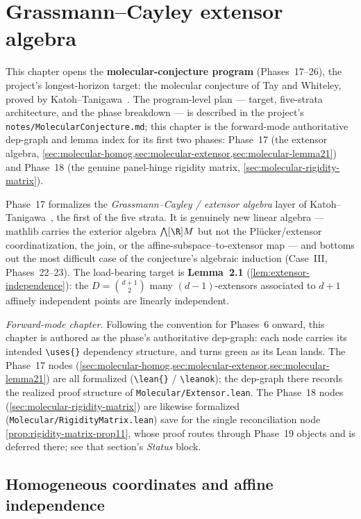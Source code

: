 \section{Grassmann--Cayley extensor algebra}
\label{sec:molecular}

This chapter opens the \textbf{molecular-conjecture program}
(Phases~17--26), the project's longest-horizon target: the molecular
conjecture of Tay and Whiteley, proved by
Katoh--Tanigawa~\cite{katohTanigawa2011}. The program-level plan ---
target, five-strata architecture, and the phase breakdown --- is
described in the project's \texttt{notes/MolecularConjecture.md}; this
chapter is the forward-mode authoritative dep-graph and lemma index for
its first two phases: Phase~17 (the extensor algebra,
\cref{sec:molecular-homog,sec:molecular-extensor,sec:molecular-lemma21})
and Phase~18 (the genuine panel-hinge rigidity matrix,
\cref{sec:molecular-rigidity-matrix}).

Phase~17 formalizes the \emph{Grassmann--Cayley / extensor algebra}
layer of Katoh--Tanigawa~\cite[\S2.1]{katohTanigawa2011}, the first of
the five strata. It is genuinely new linear algebra --- mathlib carries
the exterior algebra $\bigwedge[\R] M$ but not the Plücker/extensor
coordinatization, the join, or the affine-subspace--to-extensor map ---
and bottoms out the most difficult case of the conjecture's algebraic
induction (Case~III, Phases~22--23). The load-bearing target is
\textbf{Lemma~2.1} (\cref{lem:extensor-independence}): the
$D = \binom{d+1}{2}$ many $(d-1)$-extensors associated to $d+1$ affinely
independent points are linearly independent.

\medskip
\noindent\emph{Forward-mode chapter.} Following the convention for
Phases~6 onward, this chapter is authored as the phase's authoritative
dep-graph: each node carries its intended \texttt{\textbackslash uses\{\}}
dependency structure, and turns green as its Lean lands. The Phase~17
nodes (\cref{sec:molecular-homog,sec:molecular-extensor,sec:molecular-lemma21})
are all formalized
(\texttt{\textbackslash lean\{\}} / \texttt{\textbackslash leanok}); the
dep-graph there records the realized proof structure of
\texttt{Molecular/Extensor.lean}. The Phase~18 nodes
(\cref{sec:molecular-rigidity-matrix}) are likewise formalized
(\texttt{Molecular/RigidityMatrix.lean}) save for the single
reconciliation node \cref{prop:rigidity-matrix-prop11}, whose proof
routes through Phase~19 objects and is deferred there; see that
section's \emph{Status} block.

\subsection{Homogeneous coordinates and affine independence}
\label{sec:molecular-homog}

